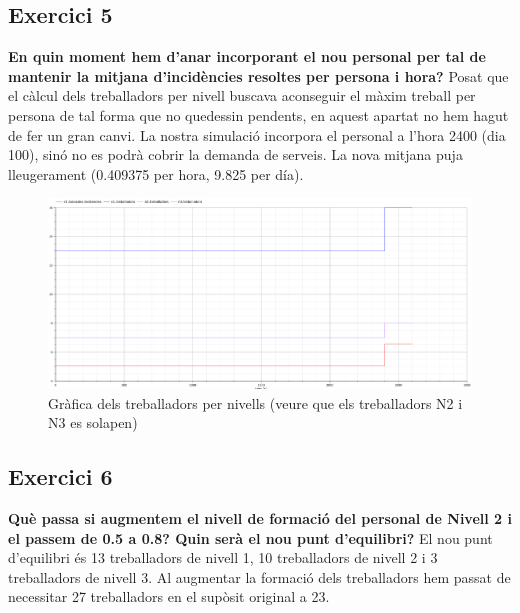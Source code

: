 \documentclass[8pt]{beamer}
\begin{document}
\subsection{Exercici 5}
\begin{frame}
\textbf{En quin moment hem d’anar incorporant el nou personal per tal de mantenir la mitjana
d’incidències resoltes per persona i hora?}
\newline
\newline
Posat que el càlcul dels treballadors per nivell buscava aconseguir el màxim treball per persona de tal forma que no quedessin pendents, en aquest apartat no hem hagut de fer un gran canvi.
La nostra simulació incorpora el personal a l'hora 2400 (dia 100), sinó no es podrà cobrir la demanda de serveis.
La nova mitjana puja lleugerament (0.409375 per hora, 9.825 per día).
\begin{figure}[h!]
  \includegraphics[width=\linewidth]{ex5.png}
  \caption{Gràfica dels treballadors per nivells (veure que els treballadors N2 i N3 es solapen)}
  \label{fig:plot1}
\end{figure}
\end{frame}

\subsection{Exercici 6}
\begin{frame}
\textbf{ Què passa si augmentem el nivell de formació del personal de Nivell 2 i el passem de 0.5
a 0.8? Quin serà el nou punt d’equilibri?}
\newline
\newline
El nou punt d'equilibri és 13 treballadors de nivell 1, 10 treballadors de nivell 2 i 3 treballadors de nivell 3.
\newline Al augmentar la formació dels treballadors hem passat de necessitar 27 treballadors en el supòsit original a 23.
\end{frame}
\end{document}
